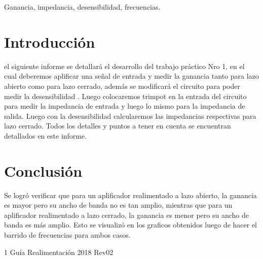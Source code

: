 \documentclass{plantilla}
\begin{document}
\maketitle

\begin{abstract}
En este informe se abordará el desarrollo del trabajo práctico Nro 1, el cual se enfoca en aplificadores realimentados.
\end{abstract}

\begin{IEEEkeywords}
Ganancia, impedancia, desensibilidad, frecuencias.
\end{IEEEkeywords}

\section{Introducción}
 el siguiente informe se detallará el desarrollo del trabajo práctico Nro 1, en el cual deberemos aplificar una señal de entrada y medir la ganancia tanto para lazo abierto como para lazo cerrado, además se modificará el circuito para poder medir la desensibilidad . Luego colocaremos trimpot en la entrada del circuito para medir la impedancia de entrada y luego lo mismo para la impedancia de salida. Luego con la desensibilidad calcularemos las impedancias respectivas para lazo cerrado. Todos los detalles y puntos a tener en cuenta se encuentran detallados en este informe.



\section{Conclusión}
Se logró verificar que para un aplificador realimentado a lazo abierto, la ganancia es mayor pero su ancho de banda no es tan amplio, mientras que para un aplificador realimentado a lazo cerrado, la ganancia es menor pero su ancho de banda es más amplio. Esto se visualizó en los graficos obtenidos luego de hacer el barrido de frecuencias para ambos casos. 

\begin{thebibliography}{1}
Guía Realimentación 2018 Rev02
\end{thebibliography}
\end{document}
